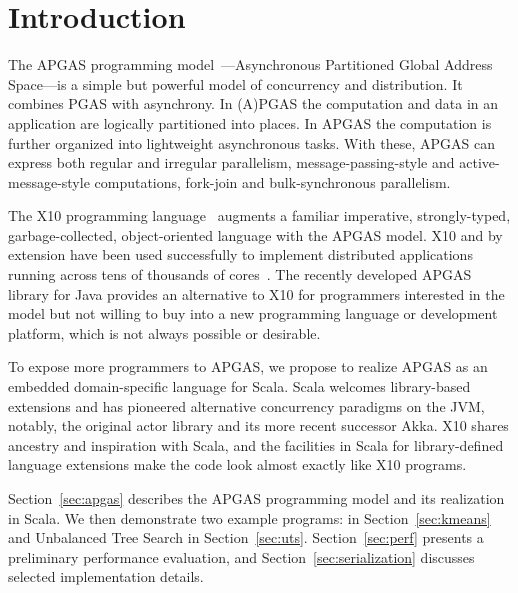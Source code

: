 \section{Introduction}

The APGAS programming model~\cite{amp10}---Asynchronous Partitioned Global Address Space---is a simple but powerful
model of concurrency and distribution. It combines PGAS with asynchrony.
In (A)PGAS the computation and data in an application are logically partitioned into places.
In APGAS the computation is further organized into lightweight asynchronous tasks.
With these, APGAS can express both
regular and irregular parallelism, message-passing-style and
active-message-style computations, fork-join and bulk-synchronous
parallelism. %

The X10 programming language~\cite{oopsla05} augments a familiar imperative, strongly-typed, garbage-collected, object-oriented language with the APGAS model.
X10 and by extension
\apgas have been used successfully to implement distributed applications
running across tens of thousands of cores~\cite{TardieuETAL14X10ApgasAtPetascale}.
The recently developed APGAS library for Java \cite{APGASJava} provides an alternative to X10 for programmers interested in the \apgas model but not willing to buy into a new programming language or development platform, which is not always possible or desirable.

To expose more programmers to APGAS, we propose to realize APGAS as an embedded domain-specific language for Scala. 
Scala welcomes library-based extensions and has pioneered alternative concurrency paradigms on the JVM,
notably, the original actor library \cite{HallerOdersky07ActorsThatUnifyThreadsEvents} and its more recent successor Akka.
X10 shares ancestry and inspiration with Scala, and the
facilities in Scala for library-defined language extensions make the code look
almost exactly like X10 programs.

Section~\ref{sec:apgas} describes the APGAS programming model and its realization in Scala. We then demonstrate two example programs: \kmeans in Section~\ref{sec:kmeans} and Unbalanced Tree Search in Section~\ref{sec:uts}. Section~\ref{sec:perf} presents a preliminary performance evaluation, and Section~\ref{sec:serialization} discusses selected implementation details.



